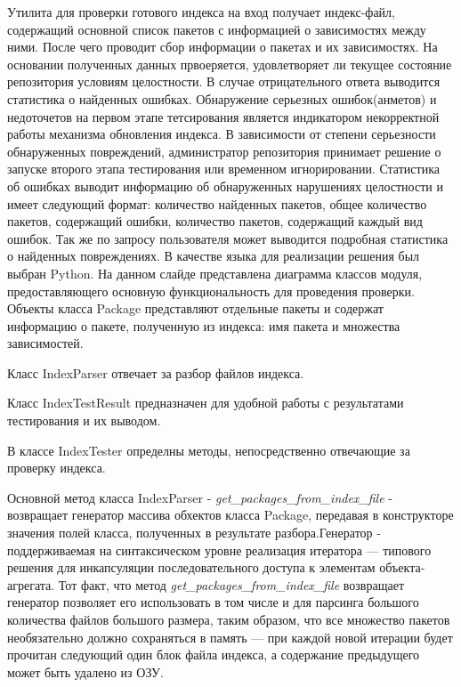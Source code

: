 \documentclass[a4paper]{article}
\begin{document}
\newpage

Утилита для проверки готового индекса на вход получает индекс-файл, содержащий основной
список пакетов с информацией о 
зависимостях между ними. После чего проводит сбор информации о пакетах и их зависимостях. 
На основании полученных данных првоеряется, удовлетворяет ли текущее состояние 
репозитория условиям целостности. В случае отрицательного ответа выводится 
статистика о найденных ошибках. Обнаружение серьезных ошибок(анметов) и недоточетов 
на первом этапе тетсирования является индикатором некорректной работы 
механизма обновления индекса. В зависимости от степени серьезности обнаруженных
повреждений, администратор репозитория принимает решение о запуске второго этапа 
тестирования или временном игнорировании.
\newpage
Статистика об ошибках выводит информацию об обнаруженных нарушениях целостности и имеет следующий формат: количество найденных пакетов, общее количество пакетов, содержащий ошибки, количество пакетов, содержащий каждый вид ошибок. Так же по запросу пользователя может
выводится подробная статистика о найденных повреждениях.
\newpage
В качестве языка для реализации решения был выбран Python. На данном слайде 
представлена диаграмма классов модуля, предоставляющего основную функциональность 
для проведения проверки. Объекты класса Package представляют отдельные пакеты 
и содержат информацию о пакете, полученную из индекса: имя пакета и множества 
зависимостей.

Класс IndexParser отвечает за разбор файлов индекса.


Класс IndexTestResult предназначен для удобной работы с результатами тестирования 
и их выводом. 

В классе IndexTester определны методы, непосредственно отвечающие за проверку индекса.

 Основной метод класса IndexParser 
- \textit{get\_packages\_from\_index\_file} - возвращает генератор массива 
обхектов класса Package, передавая в конструкторе значения полей класса, 
полученных в результате разбора.Генератор - поддерживаемая на синтаксическом уровне 
реализация итератора --- типового решения для инкапсуляции последовательного 
доступа к элементам объекта-агрегата. 
Тот факт, что метод \textit{get\_packages\_from\_index\_file} возвращает генератор позволяет
его использовать в том числе и для парсинга большого количества файлов большого размера, 
таким образом, что все множество пакетов необязательно должно сохраняться в память ---
при каждой новой итерации будет прочитан следующий один блок файла индекса, 
а содержание предыдущего может быть удалено из ОЗУ.
\newpage
\end{document}

